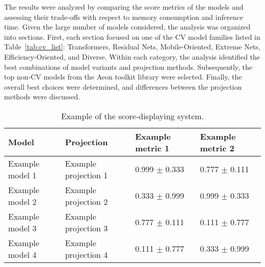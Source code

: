 The results were analyzed by comparing the score metrics of the models and assessing their trade-offs with respect to memory consumption and inference time.  Given the large number of models considered, the analysis was organized into sections. First, each section focused on one of the \gls{CV} model families listed in Table~\ref{tab:cv_list}: Transformers, Residual Nets, Mobile-Oriented, Extreme Nets, Efficiency-Oriented, and Diverse. Within each category, the analysis identified the best combinations of model variants and projection methods. Subsequently, the top non-\gls{CV} models from the Aeon toolkit library were selected. Finally, the overall best choices were determined, and differences between the projection methods were discussed.


\begin{table}[h!]
	\centering
	\caption{Example of the score-displaying system.}
	\begin{tabular}{llll}
		\toprule
		Model & Projection & Example metric 1 & Example metric 2 \\
		\midrule
		Example model 1 & Example projection 1 
			& \textcolor[rgb]{0.0,0.7,0.0}{0.999} $\pm$ \textcolor[rgb]{0.3,0.3,0.5}{0.333} 
			& \textcolor[rgb]{0.3,0.3,0.5}{0.777} $\pm$ \textcolor[rgb]{0.0,0.7,0.0}{0.111} 
		\\
		Example model 2 & Example projection 2 
			& \textcolor[rgb]{0.3,0.3,0.5}{0.333} $\pm$ \textcolor[rgb]{1.0,0.2,0.2}{0.999} 
			& \textcolor[rgb]{0.0,0.7,0.0}{0.999} $\pm$ \textcolor[rgb]{0.3,0.3,0.5}{0.333} 
		\\
		Example model 3 & Example projection 3 
			& \textcolor[rgb]{0.3,0.3,0.5}{0.777} $\pm$ \textcolor[rgb]{0.0,0.7,0.0}{0.111} 
			& \textcolor[rgb]{1.0,0.2,0.2}{0.111} $\pm$ \textcolor[rgb]{0.3,0.3,0.5}{0.777} 
		\\
		Example model 4 & Example projection 4 
			& \textcolor[rgb]{1.0,0.2,0.2}{0.111} $\pm$ \textcolor[rgb]{0.3,0.3,0.5}{0.777} 
			& \textcolor[rgb]{0.3,0.3,0.5}{0.333} $\pm$ \textcolor[rgb]{1.0,0.2,0.2}{0.999} 
		\\ 
		\bottomrule
	\end{tabular}
	\label{tab:experiments:example}
\end{table}

